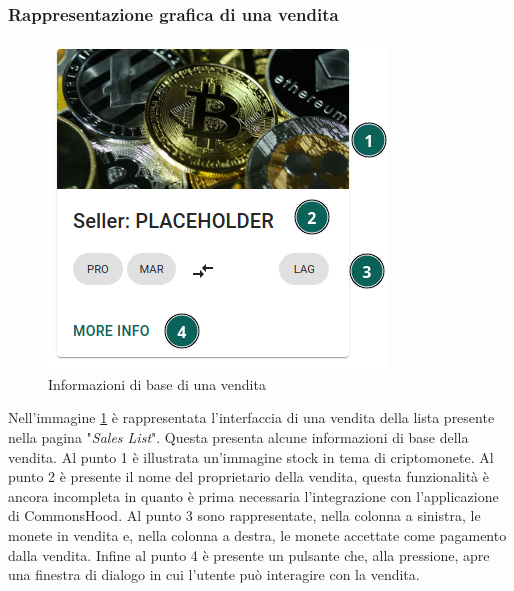 \documentclass[a4paper]{article}
\begin{document}
        \subsubsection{Rappresentazione grafica di una vendita}
        \label{moreInfo}
        \begin{figure}[H]
          \includegraphics[scale=0.7, fbox]{sale.png}
          \centering
          \caption{Informazioni di base di una vendita}
          \centering
          \label{fig:sale}
        \end{figure}
        Nell'immagine \ref{fig:sale} è rappresentata l'interfaccia di una vendita della lista presente nella pagina "\emph{Sales List}". Questa presenta alcune informazioni di base della vendita.
        Al punto 1 è illustrata un'immagine stock in tema di criptomonete. Al punto 2 è presente il nome del proprietario della vendita, questa funzionalità è ancora incompleta in quanto è prima necessaria l'integrazione con l'applicazione di CommonsHood.
        Al punto 3 sono rappresentate, nella colonna a sinistra, le monete in vendita e, nella colonna a destra, le monete accettate come pagamento dalla vendita. Infine al punto 4 è presente un pulsante che, alla pressione, apre una finestra di dialogo in cui l'utente può interagire con la vendita.
\end{document}
